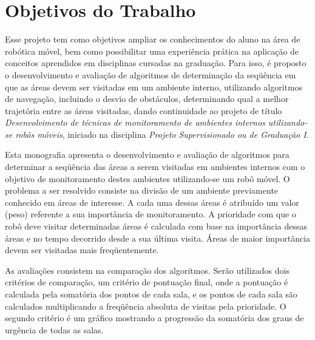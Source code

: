 \section{Objetivos do Trabalho}
\label{objetivos_trabalho}
Esse projeto tem como objetivos ampliar os conhecimentos do aluno na área de robótica móvel, bem como possibilitar uma experiência prática na aplicação de conceitos aprendidos em disciplinas cursadas na graduação. Para isso, é proposto o desenvolvimento e avaliação de algoritmos de determinação da seqüência em que as áreas devem ser visitadas em um ambiente interno, utilizando algoritmos de navegação, incluindo o desvio de obstáculos, determinando qual a melhor trajetória entre as áreas visitadas, dando continuidade ao projeto de título \textit{Desenvolvimento de técnicas de monitoramento de ambientes internos utilizando-se robôs móveis}, iniciado na disciplina \textit{Projeto Supervisionado ou de Graduação I}.

Esta monografia apresenta o desenvolvimento e avaliação de algoritmos para determinar a seqüência das áreas a serem visitadas em ambientes internos com o objetivo de monitoramento destes ambientes utilizando-se um robô móvel. O problema a ser resolvido consiste na divisão de um ambiente previamente conhecido em áreas de interesse. A cada uma dessas áreas é atribuído um valor (peso) referente a sua importância de monitoramento. A prioridade com que o robô deve visitar determinadas áreas é calculada com base na importância dessas áreas e no tempo decorrido desde a sua última visita. Áreas de maior importância devem ser visitadas mais freqüentemente. 

As avaliações consistem na comparação dos algoritmos. Serão utilizados dois critérios de comparação, um critério de pontuação final, onde a pontuação é calculada pela somatória dos pontos de cada sala, e os pontos de cada sala são calculados multiplicando a freqüência absoluta de visitas pela prioridade. O segundo critério é um gráfico mostrando a progressão da somatória dos graus de urgência de todas as salas.




